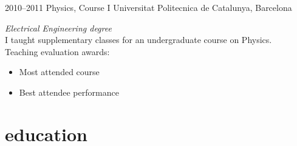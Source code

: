 \documentclass[]{friggeri-cv} %
\begin{document}
\newpage
\begin{entrylist}



\entry
{2010--2011}
{Physics, Course I}
{Universitat Politecnica de Catalunya, Barcelona}
{\emph{Electrical Engineering degree} \\
  I taught supplementary classes for an undergraduate course on Physics. \\
  Teaching evaluation awards:
  \begin{itemize}
    \item Most attended course
    \item Best attendee performance
  \end{itemize}
}


\end{entrylist}


\section{education}
\end{document}
